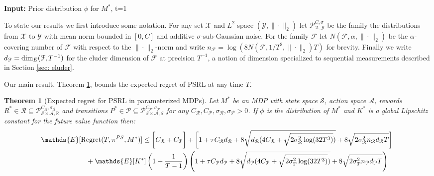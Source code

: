 \documentclass{article}
\newtheorem{theorem}{Theorem}
\newcommand{\Exp}{\mathds{E}}
\newcommand{\Real}{\mathds{R}}
\newcommand{\Xc}{\mathcal{X}}
\newcommand{\Yc}{\mathcal{Y}}
\newcommand{\Pc}{\mathcal{P}}
\newcommand{\Fc}{\mathcal{F}}
\newcommand{\Rc}{\mathcal{R}}
\newcommand{\Sc}{\mathcal{S}}
\newcommand{\Ac}{\mathcal{A}}
\begin{document}
\begin{algorithm}[H]
\caption{\protect\\ Posterior Sampling for Reinforcement Learning (PSRL)}
\label{alg: PS}

\begin{algorithmic}[1]
    \State \textbf{Input: }Prior distribution $\phi$ for $M^*$, t=1
	    \EndFor
	\EndFor
\end{algorithmic}
\end{algorithm}

To state our results we first introduce some notation.
For any set $\Xc$ and $L^2$ space $(\Yc,\|\cdot\|_2)$ let $\Pc^{C,\sigma}_{\Xc,\Yc}$ be the family the distributions from $\Xc$ to $\Yc$ with mean norm bounded in $[0,C]$ and additive $\sigma$-sub-Gaussian noise.
For the family $\Fc$ let $N(\Fc,\alpha,\|\cdot\|_2)$ be the $\alpha$-covering number of $\Fc$ with respect to the $\|\cdot\|_2$-norm and write $n_\Fc = \log(8 N(\Fc,1/T^2,\|\cdot\|_2)T)$ for brevity.
Finally we  write $d_\Fc = {\rm dim}_E(\Fc,T^{-1})$ for the eluder dimension of $\Fc$ at precision $T^{-1}$, a notion of dimension specialized to sequential measurements described in Section \ref{sec: eluder}.

Our main result, Theorem \ref{thm: main regret}, bounds the expected regret of PSRL at any time $T$.

\begin{theorem}[Expected regret for PSRL in parameterized MDPs]
\label{thm: main regret} \hspace{0.00000000000001mm} \newline
Let $M^*$ be an MDP with state space $\Sc$, action space $\Ac$, rewards $R^* \in \Rc \subseteq \Pc^{C_\Rc,\sigma_\Rc}_{\Sc \times \Ac,\Real}$ and transitions $P^* \in \Pc \subseteq \Pc^{C_\Pc,\sigma_\Pc}_{\Sc \times \Ac,\Sc}$ for any $C_\Rc, C_\Pc, \sigma_\Rc, \sigma_\Pc >0 $.
If $\phi$ is the distribution of $M^*$ and $K^*$ is a global Lipschitz constant for the future value function then:
\begin{eqnarray}
\label{eq: reg proof}
	\Exp[{\rm Regret}(T,\pi^{PS},M^*)] \le
	\bigg[ C_\Rc + C_\Pc \bigg] +
	\bigg[ 1 + \tau C_\Rc d_\Rc + 8\sqrt{d_\Rc(4C_\Rc + \sqrt{2\sigma_\Rc^2 \log(32T^3)})}
	+ 8\sqrt{2 \sigma_\Rc^2 n_\Rc d_\Rc T} \bigg] \nonumber \\
	& \hspace{-155mm} + \Exp[K^*]\left(1+\frac{1}{T-1}\right)\left( 1 + \tau C_\Pc d_\Pc + 8\sqrt{d_\Pc(4C_\Pc + \sqrt{2\sigma_\Pc^2 \log(32T^3)})}
	+ 8\sqrt{2 \sigma_\Pc^2 n_\Pc d_\Pc T} \right)
\end{eqnarray}
\end{theorem}
\end{document}
